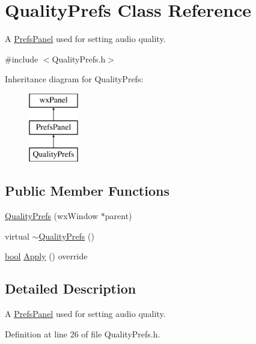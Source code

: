 \hypertarget{class_quality_prefs}{}\section{Quality\+Prefs Class Reference}
\label{class_quality_prefs}


A \hyperlink{class_prefs_panel}{Prefs\+Panel} used for setting audio quality.  




{\ttfamily \#include $<$Quality\+Prefs.\+h$>$}

Inheritance diagram for Quality\+Prefs\+:\begin{figure}[H]
\begin{center}
\leavevmode
\includegraphics[height=3.000000cm]{class_quality_prefs}
\end{center}
\end{figure}
\subsection*{Public Member Functions}
\begin{DoxyCompactItemize}
\item 
\hyperlink{class_quality_prefs_a6659d658b173f3605d429144f3c6a667}{Quality\+Prefs} (wx\+Window $\ast$parent)
\item 
virtual \hyperlink{class_quality_prefs_ad1e17e430ec2fe660cd43f23728e34f4}{$\sim$\+Quality\+Prefs} ()
\item 
\hyperlink{mac_2config_2i386_2lib-src_2libsoxr_2soxr-config_8h_abb452686968e48b67397da5f97445f5b}{bool} \hyperlink{class_quality_prefs_a196ec7a299150110ac41ca95837d87c9}{Apply} () override
\end{DoxyCompactItemize}


\subsection{Detailed Description}
A \hyperlink{class_prefs_panel}{Prefs\+Panel} used for setting audio quality. 

Definition at line 26 of file Quality\+Prefs.\+h.



